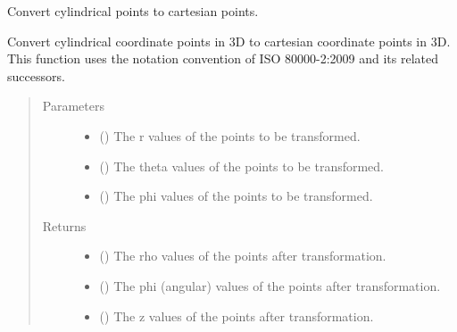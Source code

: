 \documentclass[letterpaper,10pt,english]{sphinxmanual}
\begin{document}

\begin{fulllineitems}
\label{\detokenize{Backend.coordinate_system_transformation:Backend.coordinate_system_transformation.spherical_to_cylindrical_3d}}
Convert cylindrical points to cartesian points.

Convert cylindrical coordinate points in 3D to cartesian coordinate points
in 3D. This function uses the notation convention of ISO 80000-2:2009 and
its related successors.
\begin{quote}\begin{description}
\item[{Parameters}] \leavevmode\begin{itemize}
\item {} 
 () \textendash{} The r values of the points to be transformed.

\item {} 
 () \textendash{} The theta values of the points to be transformed.

\item {} 
 () \textendash{} The phi values of the points to be transformed.

\end{itemize}

\item[{Returns}] \leavevmode
\begin{itemize}
\item {} 
 () \textendash{} The rho values of the points after transformation.

\item {} 
 () \textendash{} The phi (angular) values of the points after transformation.

\item {} 
 () \textendash{} The z values of the points after transformation.

\end{itemize}


\end{description}\end{quote}

\end{fulllineitems}
\end{document}
